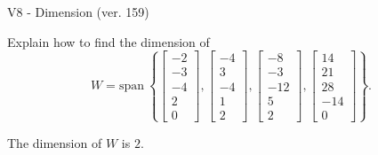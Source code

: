 \begin{exercise}
  \begin{exerciseTitle}V8 - Dimension (ver. 159)\end{exerciseTitle}
  \begin{exerciseStatement}
    Explain how to find the dimension of 
\[W=\mathrm{span}\ \left\{\left[\begin{array}{r}
-2 \\
-3 \\
-4 \\
2 \\
0
\end{array}\right] , \left[\begin{array}{r}
-4 \\
3 \\
-4 \\
1 \\
2
\end{array}\right] , \left[\begin{array}{r}
-8 \\
-3 \\
-12 \\
5 \\
2
\end{array}\right] , \left[\begin{array}{r}
14 \\
21 \\
28 \\
-14 \\
0
\end{array}\right]\right\}.\]



  \end{exerciseStatement}
  \begin{exerciseAnswer}
   The dimension of \(W\) is  \(2\).
  


  \end{exerciseAnswer}
\end{exercise}
